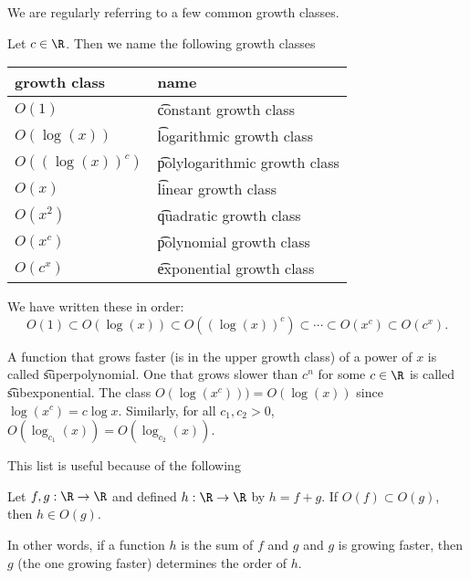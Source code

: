 

We are regularly referring to a few common growth classes.


Let $c \in \R$. Then we name the following growth classes
\begin{center}
\begin{tabular}{ll}
\toprule
	growth class & name \\
\midrule
	$O(1)$ & \t{constant growth class} \\
	$O(\log(x))$ & \t{logarithmic growth class} \\
	$O((\log(x))^c)$ & \t{polylogarithmic growth class} \\
	$O(x)$ & \t{linear growth class} \\
	$O(x^2)$ & \t{quadratic growth class} \\
	$O(x^c)$ & \t{polynomial growth class} \\
	$O(c^x)$ & \t{exponential growth class} \\
\bottomrule
\end{tabular}
\end{center}

We have written these in order:
\[
	O(1) \subset O(\log(x)) \subset O((\log(x))^c) \subset \cdots \subset O(x^c) \subset O(c^x).
\]

A function that grows faster (is in the upper growth class) of a power of $x$ is called \t{superpolynomial}.
One that grows slower than $c^n$ for some $c \in \R$ is called \t{subexponential}.
The class $O(\log(x^c))) = O(\log(x))$ since $\log(x^c) = c\log x$.
Similarly, for all $c_1, c_2 > 0$, $O(\log_{c_1}(x)) = O(\log_{c_2}(x))$.

This list is useful because of the following
\begin{proposition}
Let $f, g: \R \to \R$ and defined $h: \R \to \R$ by $h = f + g$. If $O(f) \subset O(g)$, then $h \in O(g)$.
\end{proposition}
In other words, if a function $h$ is the sum of $f$ and $g$ and $g$ is growing faster, then $g$ (the one growing faster) determines the order of $h$.

\blankpage
